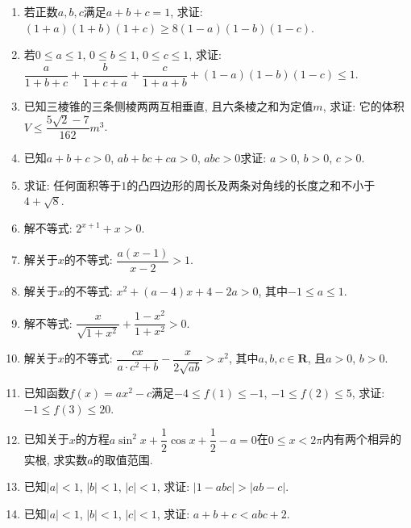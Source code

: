\documentclass[10pt,a4paper]{article}
\begin{document}
\begin{enumerate}[1.]
\item 若正数$a,b,c$满足$a+b+c=1$, 求证: $(1+a)(1+b)(1+c)\ge 8(1-a)(1-b)(1-c)$.
\item 若$0\le a\le 1$, $0\le b\le 1$, $0\le c\le 1$, 求证: $\dfrac a{1+b+c}+\dfrac b{1+c+a}+\dfrac c{1+a+b}+(1-a)(1-b)(1-c)\le 1$.
\item 已知三棱锥的三条侧棱两两互相垂直, 且六条棱之和为定值$m$, 求证: 它的体积$V\le \dfrac{5\sqrt 2-7}{162}m^3$.
\item 已知$a+b+c>0$, $ab+bc+ca>0$, $abc>0$求证: $a>0$, $b>0$, $c>0$.
\item 求证: 任何面积等于$1$的凸四边形的周长及两条对角线的长度之和不小于$4+\sqrt 8$.
\item 解不等式: $2^{x+1}+x>0$.
\item 解关于$x$的不等式: $\dfrac{a(x-1)}{x-2}>1$.
\item 解关于$x$的不等式: $x^2+(a-4)x+4-2a>0$, 其中$-1\le a\le 1$.
\item 解不等式: $\dfrac x{\sqrt{1+x^2}}+\dfrac{1-x^2}{1+x^2}>0$.
\item 解关于$x$的不等式: $\dfrac{cx}{a\cdot c^2+b}-\dfrac x{2\sqrt{ab}}>x^2$, 其中$a,b,c\in \mathbf{R}$, 且$a>0$, $b>0$.
\item 已知函数$f(x)=ax^2-c$满足$-4\le f(1)\le -1$, $-1\le f(2)\le 5$, 求证: $-1\le f(3)\le 20$.
\item 已知关于$x$的方程$a\sin^2x+\dfrac 12\cos x+\dfrac 12-a=0$在$0\le x<2\pi$内有两个相异的实根, 求实数$a$的取值范围.
\item 已知$|a|<1$, $|b|<1$, $|c|<1$, 求证: $|1-abc|>|ab-c|$.
\item 已知$|a|<1$, $|b|<1$, $|c|<1$, 求证: $a+b+c<abc+2$.
\end{enumerate}
\end{document}
